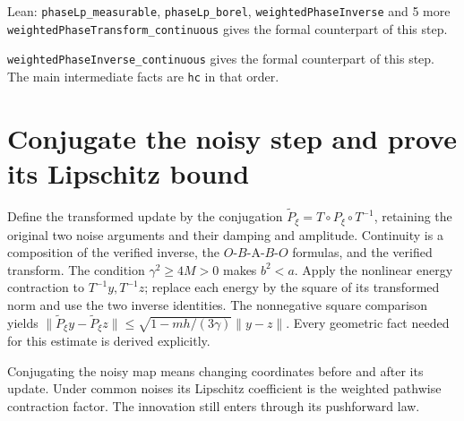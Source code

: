 \documentclass[11pt,a4paper]{article}
\begin{document}
\begin{leanbox}{Lean: \texttt{phaseLp\_\allowbreak{}measurable}, \texttt{phaseLp\_\allowbreak{}borel}, \texttt{weightedPhaseInverse} and 5 more}
\texttt{weighted\allowbreak{}Phase\allowbreak{}Transform\_\allowbreak{}continuous} gives the formal counterpart of this step.




\texttt{weighted\allowbreak{}Phase\allowbreak{}Inverse\_\allowbreak{}continuous} gives the formal counterpart of this step. The main intermediate facts are \texttt{hc} in that order.
\end{leanbox}

\section{\texorpdfstring{Conjugate the noisy step and prove its Lipschitz bound}{Conjugate the noisy step and prove its Lipschitz bound}}


Define the transformed update by the conjugation \(\widetilde P_\xi=T\circ P_\xi\circ T^{-1}\), retaining the original two noise arguments and their damping and amplitude. Continuity is a composition of the verified inverse, the \(O\)-\(B\)-A-\(B\)-\(O\) formulas, and the verified transform. The condition \(\gamma^2\ge4M>0\) makes \(b^2<a\). Apply the nonlinear energy contraction to \(T^{-1}y,T^{-1}z\); replace each energy by the square of its transformed norm and use the two inverse identities. The nonnegative square comparison yields \(\|\widetilde P_\xi y-\widetilde P_\xi z\|\le\sqrt{1-mh/(3\gamma)}\|y-z\|\). Every geometric fact needed for this estimate is derived explicitly.



Conjugating the noisy map means changing coordinates before and after its update. Under common noises its Lipschitz coefficient is the weighted pathwise contraction factor. The innovation still enters through its pushforward law.
\end{document}
